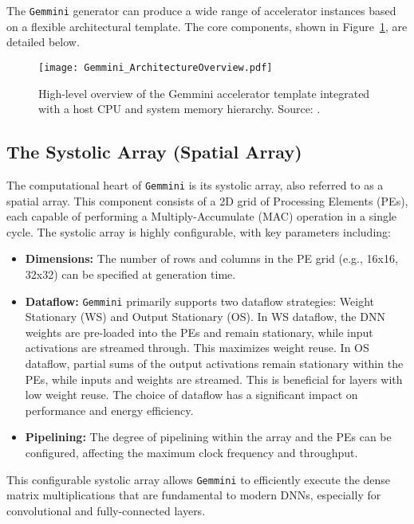 The \texttt{Gemmini} generator can produce a wide range of accelerator instances based on a flexible architectural template. The core components, shown in Figure~\ref{fig:gemmini_template}, are detailed below.

\begin{figure}[htbp]
    \centering
    \texttt{[image: Gemmini\_ArchitectureOverview.pdf]}
    \caption{High-level overview of the Gemmini accelerator template integrated with a host CPU and system memory hierarchy. Source: \cite{gemini-dac}.}
    \label{fig:gemmini_template}
\end{figure}

\subsection{The Systolic Array (Spatial Array)}
\label{subsec:systolic_array}

The computational heart of \texttt{Gemmini} is its systolic array, also referred to as a spatial array. This component consists of a 2D grid of Processing Elements (PEs), each capable of performing a Multiply-Accumulate (MAC) operation in a single cycle. The systolic array is highly configurable, with key parameters including:
\begin{itemize}
    \item \textbf{Dimensions:} The number of rows and columns in the PE grid (e.g., 16x16, 32x32) can be specified at generation time.
    \item \textbf{Dataflow:} \texttt{Gemmini} primarily supports two dataflow strategies: Weight Stationary (WS) and Output Stationary (OS). In WS dataflow, the DNN weights are pre-loaded into the PEs and remain stationary, while input activations are streamed through. This maximizes weight reuse. In OS dataflow, partial sums of the output activations remain stationary within the PEs, while inputs and weights are streamed. This is beneficial for layers with low weight reuse. The choice of dataflow has a significant impact on performance and energy efficiency.
    \item \textbf{Pipelining:} The degree of pipelining within the array and the PEs can be configured, affecting the maximum clock frequency and throughput.
\end{itemize}
This configurable systolic array allows \texttt{Gemmini} to efficiently execute the dense matrix multiplications that are fundamental to modern DNNs, especially for convolutional and fully-connected layers.

